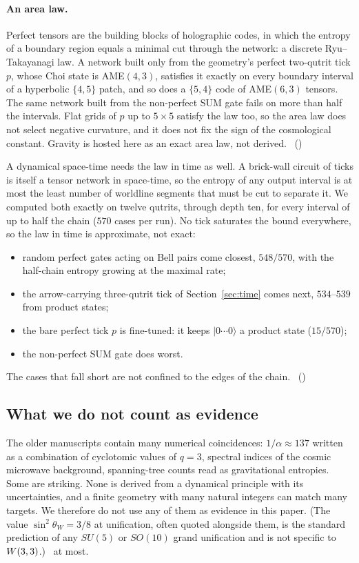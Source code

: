 \paragraph{An area law.}
Perfect tensors are the building blocks of holographic codes, in which the entropy of a boundary region equals a
minimal cut through the network: a discrete Ryu--Takayanagi law. A network built only from the geometry's perfect
two-qutrit tick $p$, whose Choi state is AME$(4,3)$, satisfies it exactly on every boundary interval of a hyperbolic
$\{4,5\}$ patch, and so does a $\{5,4\}$ code of AME$(6,3)$ tensors. The same network built from the non-perfect SUM
gate fails on more than half the intervals. Flat grids of $p$ up to $5\times5$ satisfy the law too, so the area law
does not select negative curvature, and it does not fix the sign of the cosmological constant. Gravity is hosted here
as an exact area law, not derived. \tierC\ ()

A dynamical space-time needs the law in time as well. A brick-wall circuit of ticks is itself a tensor network in
space-time, so the entropy of any output interval is at most the least number of worldline segments that must be cut
to separate it. We computed both exactly on twelve qutrits, through depth ten, for every interval of up to half the
chain ($570$ cases per run). No tick saturates the bound everywhere, so the law in time is approximate, not exact:
\begin{itemize}
\item random perfect gates acting on Bell pairs come closest, $548/570$, with the half-chain entropy growing at the
  maximal rate;
\item the arrow-carrying three-qutrit tick of Section~\ref{sec:time} comes next, $534$--$539$ from product states;
\item the bare perfect tick $p$ is fine-tuned: it keeps $\lvert0\cdots0\rangle$ a product state ($15/570$);
\item the non-perfect SUM gate does worst.
\end{itemize}
The cases that fall short are not confined to the edges of the chain. \tierC\
()

\subsection{What we do not count as evidence}

The older manuscripts contain many numerical coincidences: $1/\alpha\approx137$ written as a
combination of cyclotomic values of $q=3$, spectral indices of the cosmic microwave
background, spanning-tree counts read as gravitational entropies. Some are striking. None
is derived from a dynamical principle with its uncertainties, and a finite geometry with
many natural integers can match many targets. We therefore do not use any of them as
evidence in this paper. (The value $\sin^2\theta_W=3/8$ at unification, often quoted
alongside them, is the standard prediction of any $SU(5)$ or $SO(10)$ grand unification and
is not specific to $W(3,3)$.) \tierB\ at most.

